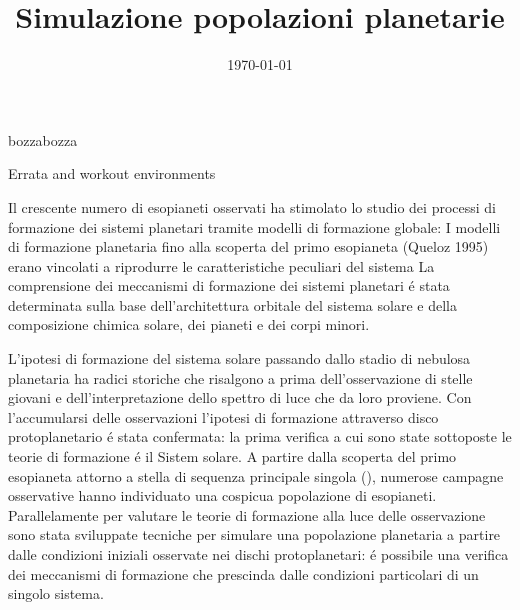 \documentclass[twoside,11pt,fleqn]{memoir}%
\author{ }
\title{Simulazione popolazioni planetarie}
\date{\today}
\def\versione{bozza}%
\def\bozza{bozza}
\begin{document}
	\ifx\versione\bozza
	\woc
	\workpoutc
	\fi
\maketitle
{}
\tableofcontents*
\mainmatter
{}
\cleartorecto
\begin{workout}
Errata and workout environments
\end{workout}
\begin{errata}
Il crescente numero di esopianeti osservati ha stimolato lo studio dei processi di formazione dei sistemi planetari tramite modelli di formazione globale: 
I modelli di formazione planetaria fino alla scoperta del primo esopianeta (Queloz 1995) erano vincolati a riprodurre le caratteristiche peculiari del sistema
La comprensione dei meccanismi di formazione dei sistemi planetari \'e stata determinata sulla base dell'architettura orbitale del sistema solare e della composizione chimica solare, dei pianeti e dei corpi minori.
\end{errata}

\begin{workout}
L'ipotesi di formazione del sistema solare passando dallo stadio di nebulosa planetaria ha radici storiche che risalgono a prima dell'osservazione di stelle giovani e dell'interpretazione dello spettro di luce che da loro proviene. Con l'accumularsi delle osservazioni l'ipotesi di formazione attraverso disco protoplanetario \'e stata confermata: la prima verifica a cui sono state sottoposte le teorie di formazione \'e il Sistem solare.
A partire dalla scoperta del primo esopianeta attorno a stella di sequenza principale singola (\cite{mayor1995jupiter}), numerose campagne osservative hanno individuato una cospicua popolazione di esopianeti. Parallelamente per valutare le teorie di formazione alla luce delle osservazione sono stata sviluppate tecniche per simulare una popolazione planetaria a partire dalle condizioni iniziali osservate nei dischi protoplanetari: \'e possibile una verifica dei meccanismi di formazione che prescinda dalle condizioni particolari di un singolo sistema.
\end{workout}
\end{document}
